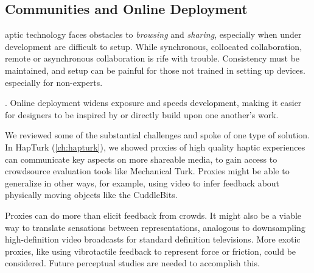 \subsection{Communities and Online Deployment}
aptic technology faces obstacles to \emph{browsing} and \emph{sharing}, especially when under development 
are difficult to setup. %
While  synchronous, collocated collaboration, remote or asynchronous collaboration is rife with trouble.
Consistency must be maintained, and setup can be painful for those not trained in setting up devices.
 especially for non-experts.

. 
Online deployment widens exposure and speeds development, making it easier for designers to be inspired by or directly build upon one another's work. 

    We reviewed some of the substantial challenges and spoke of one type of solution.
    In HapTurk (\autoref{ch:hapturk}), we showed proxies of high quality haptic experiences  can communicate key aspects on more shareable media, to gain access to crowdsource evaluation tools like Mechanical Turk.
    Proxies might be able to generalize in other ways, for example, using video to infer feedback about physically moving objects like the CuddleBits. %

    Proxies can do more than elicit feedback from crowds.
    It might also be a viable way to translate sensations between representations, analogous to downsampling high-definition video broadcasts for standard definition televisions.
    More exotic proxies, like using vibrotactile feedback to represent force or friction, could be considered. 
    Future perceptual studies are needed to accomplish this.
    
